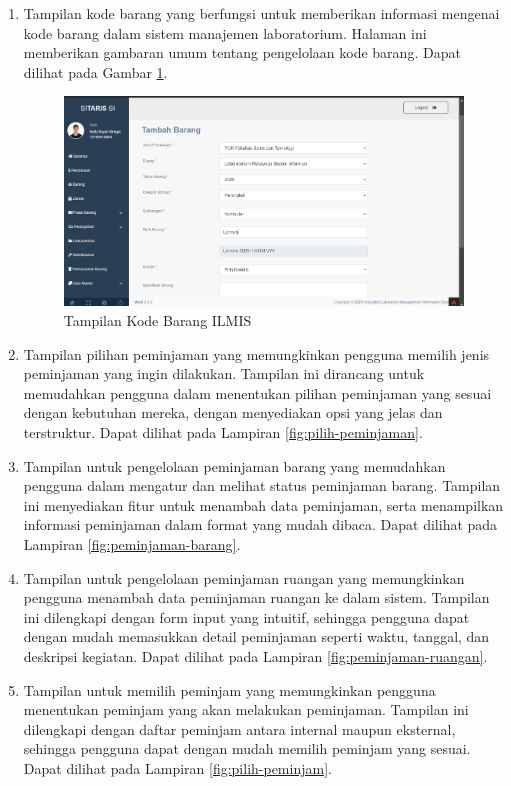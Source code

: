 \begin{enumerate}
	\item Tampilan kode barang yang berfungsi untuk memberikan informasi mengenai kode barang dalam sistem manajemen laboratorium. Halaman ini memberikan gambaran umum tentang pengelolaan kode barang. Dapat dilihat pada Gambar \ref{fig:kode-barang}.
	      \begin{figure}
		      \centering
		      \includegraphics[width=1\textwidth]{konten/gambar/perbaikan/kode-barang.png}
		      \caption{Tampilan Kode Barang ILMIS}
		      \label{fig:kode-barang}
	      \end{figure}

	\item Tampilan pilihan peminjaman yang memungkinkan pengguna memilih jenis peminjaman yang ingin dilakukan. Tampilan ini dirancang untuk memudahkan pengguna dalam menentukan pilihan peminjaman yang sesuai dengan kebutuhan mereka, dengan menyediakan opsi yang jelas dan terstruktur. Dapat dilihat pada Lampiran \ref{fig:pilih-peminjaman}.


	\item Tampilan untuk pengelolaan peminjaman barang yang memudahkan pengguna dalam mengatur dan melihat status peminjaman barang. Tampilan ini menyediakan fitur untuk menambah data peminjaman, serta menampilkan informasi peminjaman dalam format yang mudah dibaca. Dapat dilihat pada Lampiran \ref{fig:peminjaman-barang}.

	\item Tampilan untuk pengelolaan peminjaman ruangan yang memungkinkan pengguna menambah data peminjaman ruangan ke dalam sistem. Tampilan ini dilengkapi dengan form input yang intuitif, sehingga pengguna dapat dengan mudah memasukkan detail peminjaman seperti waktu, tanggal, dan deskripsi kegiatan. Dapat dilihat pada Lampiran \ref{fig:peminjaman-ruangan}.

	\item Tampilan untuk memilih peminjam yang memungkinkan pengguna menentukan peminjam yang akan melakukan peminjaman. Tampilan ini dilengkapi dengan daftar peminjam antara internal maupun eksternal, sehingga pengguna dapat dengan mudah memilih peminjam yang sesuai. Dapat dilihat pada Lampiran \ref{fig:pilih-peminjam}.

\end{enumerate}

